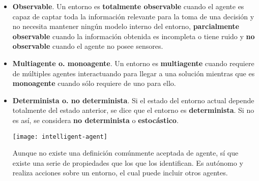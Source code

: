\begin{itemize}
	\item \textbf{Observable}. Un entorno es \textbf{totalmente observable} cuando el agente es capaz de captar toda la información relevante para la toma de una decisión y no necesita mantener ningún modelo interno del entorno, \textbf{parcialmente observable} cuando la información obtenida es incompleta o tiene ruido y \textbf{no observable} cuando el agente no posee sensores.
	\item \textbf{Multiagente o. monoagente}. Un entorno es \textbf{multiagente} cuando requiere de múltiples agentes interactuando para llegar a una solución mientras que es \textbf{monoagente} cuando sólo requiere de uno para ello.
	\item \textbf{Determinista o. no determinista}. Si el estado del entorno actual depende totalmente del estado anterior, se dice que el entorno es \textbf{determinista}. Si no es así, se considera \textbf{no determinista} o \textbf{estocástico}.

\begin{marginfigure}
	\texttt{[image: intelligent-agent]}
	\caption[Esquema general de un agente]{Aunque no existe una definición comúnmente aceptada de agente, sí que existe una serie de propiedades que los que los identifican. Es autónomo y realiza acciones sobre un entorno, el cual puede incluir otros agentes.}
	\label{fig:intelligent-agent}
\end{marginfigure}


\end{itemize}
